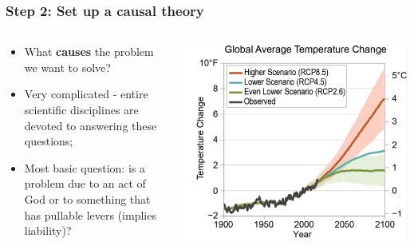 \documentclass[aspectratio=169]{beamer}
\theoremstyle{principle}
\begin{document}
\begin{frame}
\frametitle{Step 2: Set up a causal theory}
\begin{columns}
\begin{column}{0.5\textwidth}

\begin{itemize}
\item What \textbf{causes} the problem we want to solve?
\bigskip
\bigskip
\item Very complicated - entire scientific disciplines are devoted to answering these questions;
\bigskip
\bigskip
\item Most basic question: is a problem due to an act of God or to something that has pullable levers (implies liability)?
\end{itemize}

\end{column}
\begin{column}{0.5\textwidth}  %

    \begin{center}
     \includegraphics[scale=0.35]{climate.png}
     \end{center}
     \end{column}
     \end{columns}

\end{frame}
\end{document}
